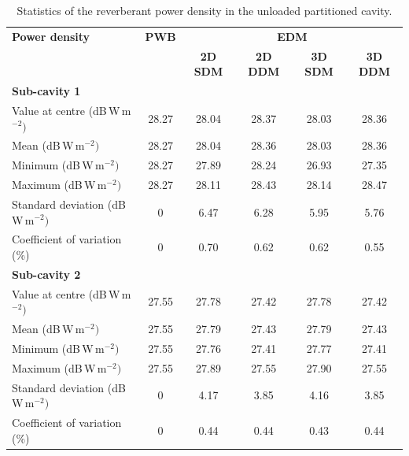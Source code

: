 \documentclass[a4paper]{article}
\numberwithin{equation}{section}
\begin{document}
\begin{table}[ht]
\begin{center}
\begin{tabular}{|l|c|c|c|c|c|}
\hline
\textbf{Power density}               &\textbf{PWB} &\multicolumn{4}{|c|}{\textbf{EDM}} \\ \cline{3-6}
{}                                   &{}           &\textbf{2D SDM} &\textbf{2D DDM} &\textbf{3D SDM} &\textbf{3D DDM} \\
\hline
\multicolumn{6}{|l|}{\textbf{Sub-cavity 1}} \\
\hline
Value at centre (dB\,W\,m$^{-2})$    &28.27        &28.04           &28.37           &28.03           &28.36 \\
Mean (dB\,W\,m$^{-2})$               &28.27        &28.04           &28.36           &28.03           &28.36 \\
Minimum (dB\,W\,m$^{-2})$            &28.27        &27.89           &28.24           &26.93           &27.35 \\
Maximum (dB\,W\,m$^{-2})$            &28.27        &28.11           &28.43           &28.14           &28.47 \\
Standard deviation (dB\,W\,m$^{-2})$ &0            &6.47            &6.28            &5.95            &5.76  \\
Coefficient of variation (\%)        &0            &0.70            &0.62            &0.62            &0.55  \\
\hline
\multicolumn{6}{|l|}{\textbf{Sub-cavity 2}} \\
\hline
Value at centre (dB\,W\,m$^{-2})$    &27.55        &27.78           &27.42           &27.78           &27.42 \\
Mean (dB\,W\,m$^{-2})$               &27.55        &27.79           &27.43           &27.79           &27.43 \\
Minimum (dB\,W\,m$^{-2})$            &27.55        &27.76           &27.41           &27.77           &27.41 \\
Maximum (dB\,W\,m$^{-2})$            &27.55        &27.89           &27.55           &27.90           &27.55 \\
Standard deviation (dB\,W\,m$^{-2})$ &0            &4.17            &3.85            &4.16            &3.85  \\
Coefficient of variation (\%)        &0            &0.44            &0.44            &0.43            &0.44  \\
\hline
\end{tabular}
\end{center}
\caption{\label{tb:partempty} Statistics of the reverberant power density in the unloaded partitioned cavity.}
\end{table}
\end{document}
